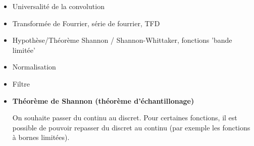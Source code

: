 \documentclass{article}
\begin{document}
\begin{itemize}
\item Universalité de la convolution

\item Transformée de Fourrier, série de fourrier, TFD
\item Hypothèse/Théorème Shannon / Shannon-Whittaker, fonctions 'bande limitée'
\item Normalisation

\item Filtre

\item \textbf{Théorème de Shannon (théorème d'échantillonage)}

On souhaite passer du continu au discret. Pour certaines fonctions, il est possible de pouvoir repasser du discret au continu (par exemple les fonctions à bornes limitées). 

\end{itemize}
\end{document}
